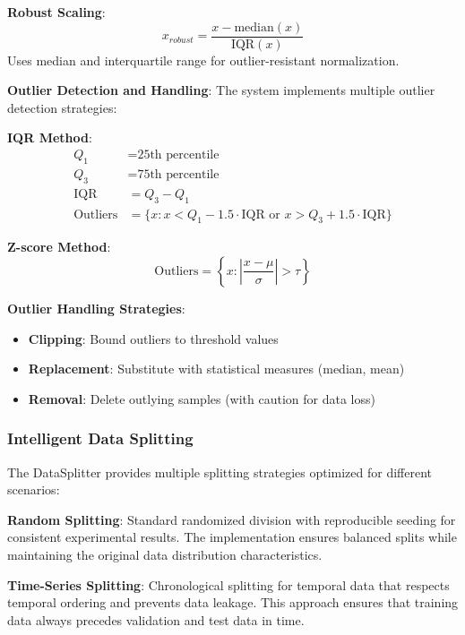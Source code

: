\documentclass[11pt,a4paper]{report}
\begin{document}
\textbf{Robust Scaling}:
\begin{equation}
x_{robust} = \frac{x - \text{median}(x)}{\text{IQR}(x)}
\end{equation}
Uses median and interquartile range for outlier-resistant normalization.

\textbf{Outlier Detection and Handling}: The system implements multiple outlier detection strategies:

\textbf{IQR Method}:
\begin{align}
Q_1 &= \text{25th percentile} \\
Q_3 &= \text{75th percentile} \\
\text{IQR} &= Q_3 - Q_1 \\
\text{Outliers} &= \{x : x < Q_1 - 1.5 \cdot \text{IQR} \text{ or } x > Q_3 + 1.5 \cdot \text{IQR}\}
\end{align}

\textbf{Z-score Method}:
\begin{equation}
\text{Outliers} = \left\{x : \left|\frac{x - \mu}{\sigma}\right| > \tau\right\}
\end{equation}

\textbf{Outlier Handling Strategies}:
\begin{itemize}
\item \textbf{Clipping}: Bound outliers to threshold values
\item \textbf{Replacement}: Substitute with statistical measures (median, mean)
\item \textbf{Removal}: Delete outlying samples (with caution for data loss)
\end{itemize}

\subsubsection{Intelligent Data Splitting}

The DataSplitter provides multiple splitting strategies optimized for different scenarios:

\textbf{Random Splitting}: Standard randomized division with reproducible seeding for consistent experimental results. The implementation ensures balanced splits while maintaining the original data distribution characteristics.

\textbf{Time-Series Splitting}: Chronological splitting for temporal data that respects temporal ordering and prevents data leakage. This approach ensures that training data always precedes validation and test data in time.
\end{document}

